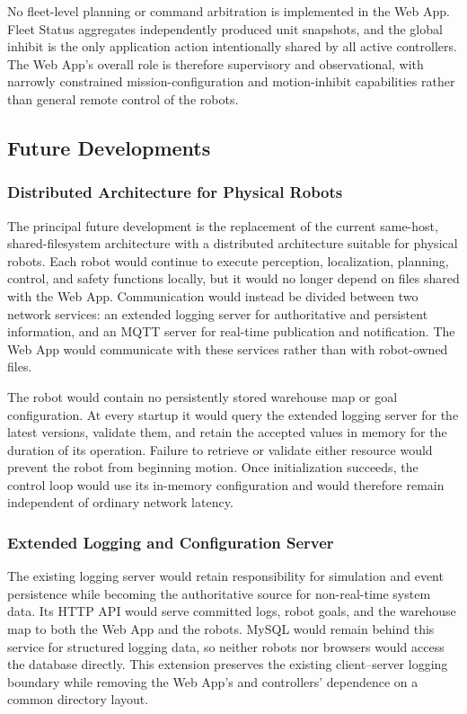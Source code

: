 No fleet-level planning or command arbitration is implemented in the Web App. Fleet Status aggregates independently produced unit snapshots, and the global inhibit is the only application action intentionally shared by all active controllers. The Web App's overall role is therefore supervisory and observational, with narrowly constrained mission-configuration and motion-inhibit capabilities rather than general remote control of the robots.

\subsection{Future Developments}
\label{subsec:webapp-future-developments}

\subsubsection{Distributed Architecture for Physical Robots}

The principal future development is the replacement of the current same-host, shared-filesystem architecture with a distributed architecture suitable for physical robots. Each robot would continue to execute perception, localization, planning, control, and safety functions locally, but it would no longer depend on files shared with the Web App. Communication would instead be divided between two network services: an extended logging server for authoritative and persistent information, and an MQTT server for real-time publication and notification. The Web App would communicate with these services rather than with robot-owned files.

The robot would contain no persistently stored warehouse map or goal configuration. At every startup it would query the extended logging server for the latest versions, validate them, and retain the accepted values in memory for the duration of its operation. Failure to retrieve or validate either resource would prevent the robot from beginning motion. Once initialization succeeds, the control loop would use its in-memory configuration and would therefore remain independent of ordinary network latency.

\subsubsection{Extended Logging and Configuration Server}

The existing logging server would retain responsibility for simulation and event persistence while becoming the authoritative source for non-real-time system data. Its HTTP API would serve committed logs, robot goals, and the warehouse map to both the Web App and the robots. MySQL would remain behind this service for structured logging data, so neither robots nor browsers would access the database directly. This extension preserves the existing client--server logging boundary while removing the Web App's and controllers' dependence on a common directory layout.

